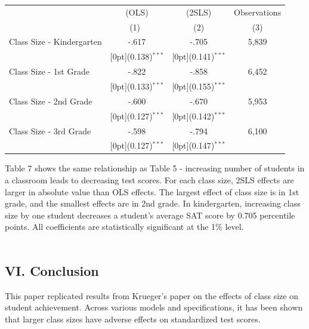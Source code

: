 \documentclass[a4paper,11pt]{article}
\begin{document}
\begin{table}[H]
\begin{tabular*}{\textwidth}{@{\extracolsep{\fill}}lccc}		
	& \multicolumn{1}{c}{(OLS)} &	\multicolumn{1}{c}{(2SLS)} &	\multicolumn{1}{c}{Observations}\\
	\cline{2-4}		
	& \multicolumn{1}{c}{(1)\mbox{\ }} &	\multicolumn{1}{c}{(2)}  & \multicolumn{1}{c}{(3)} \\
	\hline		
	Class Size - Kindergarten&	-.617 &	-.705  & 5,839 \\
	&	\raisebox{.7ex}[0pt]{\scriptsize (0.138)$^{***}$} &	\raisebox{.7ex}[0pt]{\scriptsize (0.141)$^{***}$} &\\
	Class Size - 1st Grade &	-.822 &	-.858 & 6,452 \\
	&	\raisebox{.7ex}[0pt]{\scriptsize (0.133)$^{***}$} &	\raisebox{.7ex}[0pt]{\scriptsize (0.155)$^{***}$} & \\
	Class Size - 2nd Grade &	-.600 &	-.670 & 5,953 \\
	&	\raisebox{.7ex}[0pt]{\scriptsize (0.127)$^{***}$} &	\raisebox{.7ex}[0pt]{\scriptsize (0.142)$^{***}$} & \\	
	Class Size - 3rd Grade &	-.598 &	-.794 & 6,100 \\
	&	\raisebox{.7ex}[0pt]{\scriptsize (0.127)$^{***}$} &	\raisebox{.7ex}[0pt]{\scriptsize (0.147)$^{***}$} & \\
	\hline\hline		
\end{tabular*}
\end{table}

Table 7 shows the same relationship as Table 5 - increasing number of students in a classroom leads to decreasing test scores. For each class size, 2SLS effects are larger in absolute value than OLS effects. The largest effect of class size is in 1st grade, and the smallest effects are in 2nd grade. In kindergarten, increasing class size by one student decreases a student's average SAT score by 0.705 percentile points. All coefficients are statistically significant at the 1\% level. \\ \\ 



\subsection*{VI. Conclusion}

This paper replicated results from Krueger's paper on the effects of class size on student achievement. Across various models and specifications, it has been shown that larger class sizes have adverse effects on standardized test scores. \par
\end{document}
